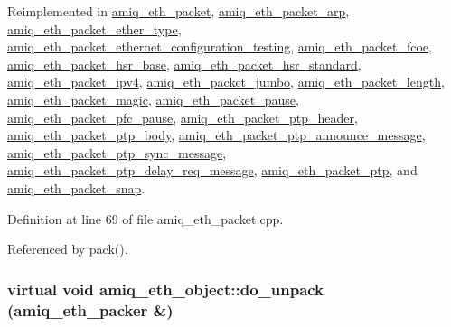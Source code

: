 Reimplemented in \hyperlink{classamiq__eth__packet_ab580d89fb44208f5a0fe31443619473e}{amiq\_\-eth\_\-packet}, \hyperlink{classamiq__eth__packet__arp_aa0919231910bf804ffafd9b1b771785f}{amiq\_\-eth\_\-packet\_\-arp}, \hyperlink{classamiq__eth__packet__ether__type_a62fe5f26a466f0bd0045599b89aa6926}{amiq\_\-eth\_\-packet\_\-ether\_\-type}, \hyperlink{classamiq__eth__packet__ethernet__configuration__testing_a4ae6c0485066d7661170544fa64c7e49}{amiq\_\-eth\_\-packet\_\-ethernet\_\-configuration\_\-testing}, \hyperlink{classamiq__eth__packet__fcoe_ae119ce0a219ea22eef14da61262afbb7}{amiq\_\-eth\_\-packet\_\-fcoe}, \hyperlink{classamiq__eth__packet__hsr__base_a6dc22f94409c889f248908b1454af8b0}{amiq\_\-eth\_\-packet\_\-hsr\_\-base}, \hyperlink{classamiq__eth__packet__hsr__standard_a1dce9b763e3222c2fe257b15df912514}{amiq\_\-eth\_\-packet\_\-hsr\_\-standard}, \hyperlink{classamiq__eth__packet__ipv4_a8130e24da66bbd16c4edc7b6a608a5e9}{amiq\_\-eth\_\-packet\_\-ipv4}, \hyperlink{classamiq__eth__packet__jumbo_a1f2906c7128a79c356e152368584d2e8}{amiq\_\-eth\_\-packet\_\-jumbo}, \hyperlink{classamiq__eth__packet__length_a0e4e4b570a84eda1274ff8f0e76b45df}{amiq\_\-eth\_\-packet\_\-length}, \hyperlink{classamiq__eth__packet__magic_ad026a187c1d882aa1698a3b0d4209472}{amiq\_\-eth\_\-packet\_\-magic}, \hyperlink{classamiq__eth__packet__pause_aaea61c8cafc5274eac5d2b5428876868}{amiq\_\-eth\_\-packet\_\-pause}, \hyperlink{classamiq__eth__packet__pfc__pause_ac06dfc3d16b73113bbd42460ddbc9c4b}{amiq\_\-eth\_\-packet\_\-pfc\_\-pause}, \hyperlink{classamiq__eth__packet__ptp__header_ad850767754579cc65075215571e59d85}{amiq\_\-eth\_\-packet\_\-ptp\_\-header}, \hyperlink{classamiq__eth__packet__ptp__body_a3df3ad9b3a4ef7ec42357565d44ede05}{amiq\_\-eth\_\-packet\_\-ptp\_\-body}, \hyperlink{classamiq__eth__packet__ptp__announce__message_a158d8eb0b4081bdfbce9d4b34be6daf7}{amiq\_\-eth\_\-packet\_\-ptp\_\-announce\_\-message}, \hyperlink{classamiq__eth__packet__ptp__sync__message_a5bb7abd15c0d2d2d733f042ad13c898d}{amiq\_\-eth\_\-packet\_\-ptp\_\-sync\_\-message}, \hyperlink{classamiq__eth__packet__ptp__delay__req__message_a746ff6b9bc45d17e7158525b6433f21a}{amiq\_\-eth\_\-packet\_\-ptp\_\-delay\_\-req\_\-message}, \hyperlink{classamiq__eth__packet__ptp_a5d415af5fcb6ed2cb603aaf0105fdd43}{amiq\_\-eth\_\-packet\_\-ptp}, and \hyperlink{classamiq__eth__packet__snap_ace29c0c126f983a5e88ff933f1b34ff6}{amiq\_\-eth\_\-packet\_\-snap}.

Definition at line 69 of file amiq\_\-eth\_\-packet.cpp.

Referenced by pack().\hypertarget{classamiq__eth__object_aaa82659e656422df7dcf2cce578fc7d7}{
\subsubsection[{do\_\-unpack}]{\setlength{\rightskip}{0pt plus 5cm}virtual void amiq\_\-eth\_\-object::do\_\-unpack ({\bf amiq\_\-eth\_\-packer} \&)}}
\label{classamiq__eth__object_aaa82659e656422df7dcf2cce578fc7d7}


